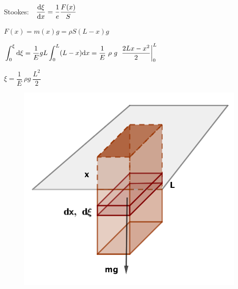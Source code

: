 \begin{multicols}{2}
Stookes: $\ \ \displaystyle \dv{\xi}{x}=\dfrac 1 e \dfrac {F(x)}{S}$

$F(x)=m(x)g=\rho S (L-x) g$

$\displaystyle \int_0^\xi \dd \xi = \dfrac 1 E g L \int_0^L (L-x) \dd x=\dfrac 1 E \ \rho \ g \ \eval{\dfrac{2Lx-x^2}{2}}_0^L$

$\xi = \dfrac 1 E \ \rho g \ \dfrac {L^2} 2$
\begin{figure}[H]
	\centering
	\includegraphics[width=.5\textwidth]{imagenes/imagenes09/T09IM09.png}
\end{figure}	
\end{multicols}


\newpage %

